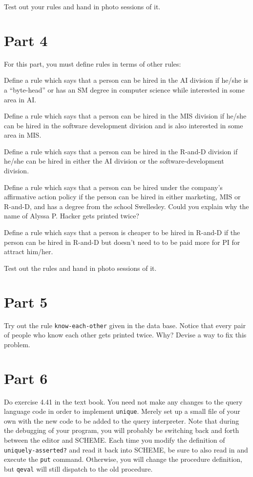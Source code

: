 Test out your rules and hand in photo sessions of it.

\section{Part 4}

For this part, you must define rules in terms of other rules:

\bpar Define a rule which says that a person can be hired in the
         AI division if he/she is a ``byte-head'' or has an SM degree
         in computer science while interested in some area in AI.

\bpar Define a rule which says that a person can be hired in the
         MIS division if he/she can be hired in the software development
         division and is also interested in some area in MIS.

\bpar Define a rule which says that a person can be hired in the
         R-and-D division if he/she can be hired in either the AI division
         or the software-development division.

\bpar Define a rule which says that a person can be hired under the
         company's affirmative action policy if the person can be hired
         in either marketing, MIS or R-and-D, and has a degree from the
         school Swellesley.  Could you explain why the name of
         Alyssa P. Hacker gets printed twice?

\bpar Define a rule which says that a person is cheaper to be hired
         in R-and-D if the person can be hired in R-and-D but doesn't need to
         to be paid more for PI for attract him/her.

\endbullets
\vpar
Test out the rules and hand in photo sessions of it.

\section{Part 5}

Try out the rule {\tt know-each-other} given in the data base.  Notice
that every pair of people who know each other gets printed twice.
Why? Devise a way to fix this problem.

\section{Part 6}

Do exercise 4.41 in the text book.  You need not make any changes to the
query language code in order to implement {\tt unique}.  Merely set up a
small file of your own with the new code to be added to the query interpreter.
Note that during the debugging of your program, you will probably be 
switching back and forth between the editor and SCHEME.  Each time you
modify the definition of {\tt uniquely-asserted?} and read it back into
SCHEME, be sure to also read in and execute the {\tt put} command.
Otherwise, you will change the procedure definition, but {\tt qeval} will
still dispatch to the old procedure.

